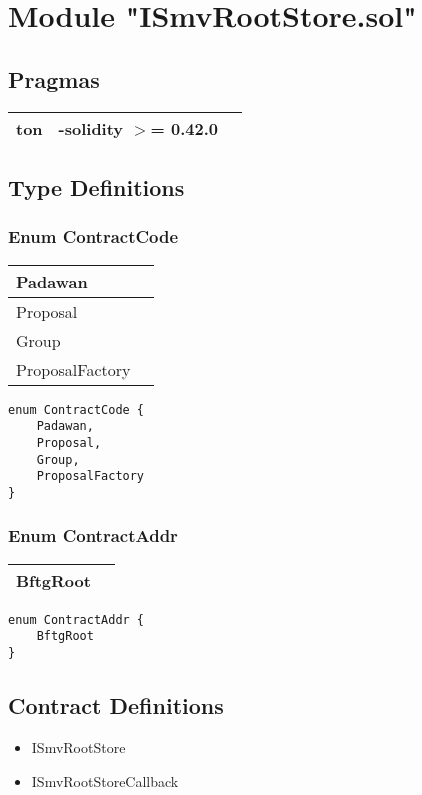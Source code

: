 
\section{Module "ISmvRootStore.sol"}


\subsection{Pragmas}


\noindent\begin{tabular}{|l|l|p{5cm}|}\hline
ton & -solidity $>$= 0.42.0 &\\\hline
\end{tabular}


\subsection{Type Definitions}


\subsubsection{Enum ContractCode}


\ifsoltables
\noindent\begin{tabular}{|l|p{6cm}|}\hline
Padawan & \\\hline
Proposal & \\\hline
Group & \\\hline
ProposalFactory & \\\hline
\end{tabular}
\fi


\begin{lstlisting}[firstnumber=3]
enum ContractCode {
    Padawan,
    Proposal,
    Group,
    ProposalFactory
}
\end{lstlisting}

\subsubsection{Enum ContractAddr}


\ifsoltables
\noindent\begin{tabular}{|l|p{6cm}|}\hline
BftgRoot & \\\hline
\end{tabular}
\fi


\begin{lstlisting}[firstnumber=10]
enum ContractAddr {
    BftgRoot
}
\end{lstlisting}

\subsection{Contract Definitions}

\begin{itemize}
\item ISmvRootStore
\item ISmvRootStoreCallback
\end{itemize}
